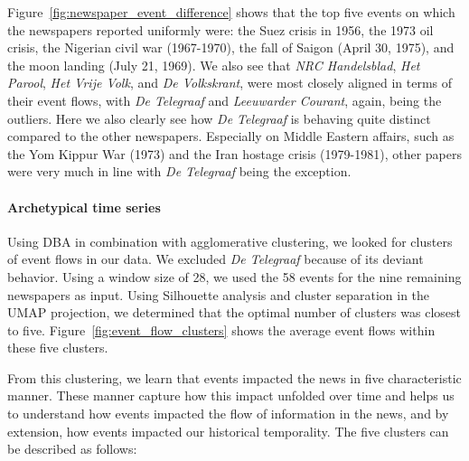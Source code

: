 \documentclass[]{ceurart}
\begin{document}
Figure~\ref{fig:newspaper_event_difference} shows that the top five events on which the newspapers reported uniformly were: the Suez crisis in 1956, the 1973 oil crisis, the Nigerian civil war (1967-1970), the fall of Saigon (April 30, 1975), and the moon landing (July 21, 1969). We also see that \textit{NRC Handelsblad}, \textit{Het Parool}, \textit{Het Vrije Volk}, and \textit{De Volkskrant}, were most closely aligned in terms of their event flows, with \textit{De Telegraaf} and \textit{Leeuwarder Courant}, again, being the outliers. Here we also clearly see how \textit{De Telegraaf} is behaving quite distinct compared to the other newspapers. Especially on Middle Eastern affairs, such as the Yom Kippur War (1973) and the Iran hostage crisis (1979-1981), other papers were very much in line with \textit{De Telegraaf} being the exception. 

\paragraph{Archetypical time series}
Using DBA in combination with agglomerative clustering, we looked for clusters of event flows in our data. We excluded \textit{De Telegraaf} because of its deviant behavior. Using a window size of 28, we used the 58 events for the nine remaining newspapers as input. Using Silhouette analysis and cluster separation in the UMAP projection, we determined that the optimal number of clusters was closest to five. Figure~\ref{fig:event_flow_clusters} shows the average event flows within these five clusters. 

From this clustering, we learn that events impacted the news in five characteristic manner. These manner capture how this impact unfolded over time and helps us to understand how events impacted the flow of information in the news, and by extension, how events impacted our historical temporality. The five clusters can be described as follows:
\end{document}
